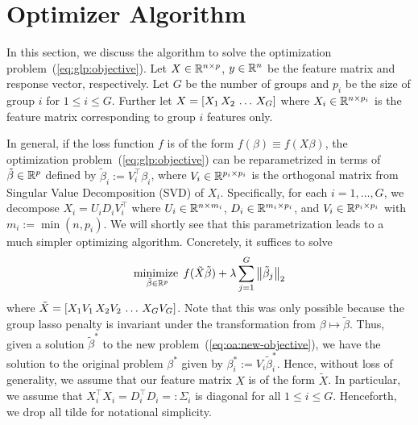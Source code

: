 \section{Optimizer Algorithm}\label{sec:optimizer}

In this section, we discuss the algorithm to solve the optimization problem~(\ref{eq:glp:objective}).
Let $X \in \mathbb{R}^{n\times p}$, $y\in \mathbb{R}^n$ be the feature matrix and response vector, respectively.
Let $G$ be the number of groups and $p_i$ be the size of group $i$ for $1\leq i\leq G$.
Further let $X = \left[X_1 \, X_2 \, \ldots \, X_G\right]$ where $X_i \in \mathbb{R}^{n \times p_i}$ is the feature matrix
corresponding to group $i$ features only.

In general, if the loss function $f$ is of the form $f(\beta) \equiv f(X\beta)$,
the optimization problem~(\ref{eq:glp:objective}) can be reparametrized
in terms of $\tilde{\beta} \in \mathbb{R}^p$ defined by $\tilde{\beta}_i := V_i^\top \beta_i$,
where $V_i \in \mathbb{R}^{p_i \times p_i}$ is the orthogonal matrix from Singular Value Decomposition (SVD) 
of $X_i$. 
Specifically, for each $i=1,\ldots, G$, we decompose $X_i = U_i D_i V_i^\top$
where $U_i \in \mathbb{R}^{n \times m_i}$, $D_i \in \mathbb{R}^{m_i \times p_i}$, and $V_i \in \mathbb{R}^{p_i \times p_i}$
with $m_i := \min(n, p_i)$.
We will shortly see that this parametrization leads to a much simpler optimizing algorithm. 
Concretely, it suffices to solve
\begin{align}
    \operatorname*{minimize\;}_{\tilde{\beta} \in \mathbb{R}^p}
    f(\tilde{X} \tilde{\beta})
    + \lambda \sum\limits_{j=1}^G \left\|\tilde{\beta}_j\right\|_2
    \label{eq:oa:new-objective}
\end{align}
where $\tilde{X} = \left[X_1 V_1 \, X_2 V_2 \, \ldots \, X_G V_G\right]$.
Note that this was only possible because the group lasso penalty is invariant under
the transformation from $\beta \mapsto \tilde{\beta}$.
Thus, given a solution $\tilde{\beta}^*$ to the new problem~(\ref{eq:oa:new-objective}),
we have the solution to the original problem $\beta^*$ given by
$\beta^*_i := V_i \tilde{\beta}_i^*$.
Hence, without loss of generality, we assume that 
our feature matrix $X$ is of the form $\tilde{X}$.
In particular, we assume that $X_i^\top X_i = D_i^\top D_i =: \Sigma_i$ is diagonal for all $1\leq i\leq G$.
Henceforth, we drop all tilde for notational simplicity.

